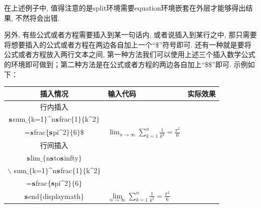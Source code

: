 在上述例子中, 值得注意的是split环境需要equation环境嵌套在外层才能够得出结果, 不然将会出错.


另外, 有些公式或者方程需要插入到某一句话内, 或者说插入到某行之中, 那只需要将想要插入的公式或者方程在两边各自加上一个“\$”符号即可. 还有一种就是要将公式或者方程放入两行文本之间, 第一种方法我们可以使用上述三个插入数学公式的环境即可做到；第二种方法是在公式或者方程的两边各自加上“\$\$”即可. 示例如下：
\def\parlen{180pt}
\begin{center}\renewcommand\arraystretch{1.2}
    \begin{tabular}{c|l|c}
    插入情况& 输入代码 & 实际效果 \\\hline
    行内插入
        &\makecell[l]{%
          \$ $\bs$lim$\_\{$n$\bs$to$\bs$infty$\}$\\[-5pt]
          $\bs$sum$\_\{$k=1$\}$\^{}n$\bs$frac$\{$1$\}\{$k\^{}2$\}$\\[-5pt]
          =$\bs$frac$\{{\mathbf s}$pi\^{}2$\}\{$6$\}\$$}
        &$\lim_{n\to\infty}\sum_{k=1}^n\frac{1}{k^2}
                =\frac{\pi^2}{6}$\\ \hline
    行间插入&
        \makecell[l]{
           $\bs$begin$\{$displaymath$\}$\\[-5pt]
           $\bs$lim$\_\{$n$\bs$to$\bs$infty$\}$\\ [-5pt] \hspace{-10pt}$\backslash$ sum$\_\{$k=1$\}$\^{}n$\bs$frac$\{$1$\}\{$k\^{}2$\}$\\[-5pt]
            =$\bs$frac$\{{\mathbf s}$pi\^{}2$\}\{$6$\}$\\[-5pt]
            $\bs$end$\{$displaymath$\}$}
            &$\lim\limits_{n\to\infty}
            \displaystyle\sum_{k=1}^n\frac{1}{k^2}
            =\frac{\pi^2}{6}$\\ \hline
    \end{tabular}
\end{center}
\medskip

